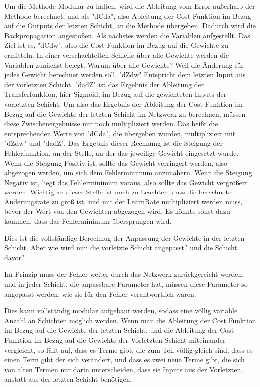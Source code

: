 \documentclass[12pt]{article}
\begin{document}
Um die Methode Modular zu halten, wird die Ableitung vom Error außerhalb der Methode berechnet, und als "dCda", also Ableitung der Cost Funktion im Bezug auf die Outputs der letzten Schicht, an die Methode übergeben. Dadurch wird die Backpropagation angestoßen. Als nächstes werden die Variablen aufgestellt. Das Ziel ist es, "dCdw", also die Cost Funktion im Bezug auf die Gewichte zu ermitteln. 
In einer verschachtelten Schleife über alle Gewichte werden die Variablen zunächst belegt.
Warum über alle Gewichte? Weil die Änderung für jedes Gewicht berechnet werden soll. 
"dZdw" Entspricht dem letzten Input aus der vorletzten Schicht. "dadZ" ist das Ergebnis der Ableitung der Transferfunktion, hier Sigmoid, im Bezug auf die gewichteten Inputs der vorletzten Schicht.
Um also das Ergebnis der Ableitung der Cost Funktion im Bezug auf die Gewichte der letzten Schicht im Netzwerk zu berechnen, müssen diese Zwischenergebnisse nur noch multipliziert werden. Das heißt die entsprechenden Werte von "dCda", die übergeben wurden, multipliziert mit "dZdw" und "dadZ".
Das Ergebnis dieser Rechnung ist die Steigung der Fehlerfunktion, an der Stelle, an der das jeweilige Gewicht eingesetzt wurde. Wenn die Steigung Positiv ist, sollte das Gewicht verringert werden, also abgezogen werden, um sich dem Fehlerminimum anzunähern.
Wenn die Steigung Negativ ist, liegt das Fehlerminimum voraus, also sollte das Gewicht vergrößert werden.
Wichtig an dieser Stelle ist noch zu beachten, dass die berechnete Änderungsrate zu groß ist, und mit der LearnRate multipliziert werden muss, bevor der Wert von den Gewichten abgezogen wird. Es könnte sonst dazu kommen, dass das Fehlerminimum übersprungen wird.

Dies ist die vollständige Berechnug der Anpassung der Gewichte in der letzten Schicht. Aber wie wird nun die vorletzte Schicht angepasst? und die Schicht davor?

Im Prinzip muss der Fehler weiter durch das Netzwerk zurückgereicht werden, und in jeder Schicht, die anpassbare Parameter hat, müssen diese Parameter so angepasst werden, wie sie für den Fehler verantwortlich waren.

Dies kann vollständig modular aufgebaut werden, sodass eine völlig variable Anzahl an Schichten möglich werden. Wenn man die Ableitung der Cost Funktion im Bezug auf die Gewichte der letzten Schicht, und die Ableitung der Cost Funktion im Bezug auf die Gewichte der Vorletzten Schicht miteinander vergleicht, so fällt auf, dass es Terme gibt, die zum Teil völlig gleich sind, dass es einen Term gibt der sich verändert, und dass es zwei neue Terme gibt, die sich von alten Termen nur darin unterscheiden, dass sie Inputs aus der Vorletzten, anstatt aus der letzten Schicht benötigen.
\end{document}
